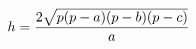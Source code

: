 \documentclass[preview]{standalone}
\begin{document}
\begin{align*}
\special{dvisvgm:raw <g id='unique000'>}h = \frac{2\sqrt{p(p-a)(p-b)(p-c)}}{a}\special{dvisvgm:raw </g>}
\end{align*}
\end{document}
